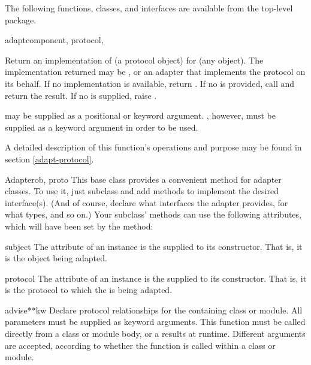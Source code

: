\begin{verbatim%
}
\begin{verbatim%
}
\begin{verbatim%
}
\begin{verbatim%
}
\begin{verbatim%
}
\begin{verbatim%
}
The following functions, classes, and interfaces are available from the
top-level  package.

\begin{funcdesc}{adapt}{component, protocol,
}

Return an implementation of  (a protocol object) for
 (any object).  The implementation returned may be
, or an adapter that implements the protocol on its
behalf.  If no implementation is available, return .  If no
 is provided, call  and return the result.  If no  is supplied,
raise .

 may be supplied as a positional or keyword argument.
, however, must be supplied as a keyword argument in order
to be used.

A detailed description of this function's operations and purpose may be found in
section \ref{adapt-protocol}.
\end{funcdesc}

\begin{classdesc}{Adapter}{ob, proto}
This base class provides a convenient  method for adapter
classes.  To use it, just subclass  and add methods
to implement the desired interface(s).  (And of course, declare what interfaces
the adapter provides, for what types, and so on.)  Your subclass' methods can
use the following attributes, which will have been set by the 
method:

\begin{memberdesc}{subject}
The  attribute of an  instance is
the  supplied to its constructor.  That is, it is the object being
adapted.
\end{memberdesc}



\begin{memberdesc}{protocol}
The  attribute of an  instance is
the  supplied to its constructor.  That is, it is the protocol to
which the  is being adapted.
\end{memberdesc}
\end{classdesc}

\begin{funcdesc}{advise}{**kw}
Declare protocol relationships for the containing class or module.  All
parameters must be supplied as keyword arguments.  This function must be
called directly from a class or module body, or a 
results at runtime.  Different arguments are accepted, according to whether
the function is called within a class or module.


\end{funcdesc}
\end{verbatim%
}
\end{verbatim%
}
\end{verbatim%
}
\end{verbatim%
}
\end{verbatim%
}
\end{verbatim%
}
